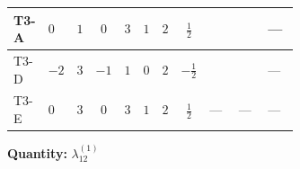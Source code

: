 \documentclass[8pt]{article}
\begin{document}
\begin{landscape}
\begin{longtable}{@{}llcccccc >{\raggedright\arraybackslash}p{0.21\linewidth} >{\raggedright\arraybackslash}p{0.21\linewidth} >{\raggedright\arraybackslash}p{0.21\linewidth}@{}}
\midrule
T3-A & $0$ & $1$ & $0$ & $3$ & $1$ & $2$ & $\frac{1}{2}$ & \scriptsize\adjustbox{max width=\linewidth}{$\begin{gathered} +4 {\lambda_{12}^{(1)}} {\lambda_{S_1}^{(1)}}\end{gathered}$} & \scriptsize\adjustbox{max width=\linewidth}{$\begin{gathered} +8 {\lambda_{12}^{(1)}} {\lambda_{S_2}^{(1)}}\end{gathered}$} & --- \\
\midrule
T3-D & $-2$ & $3$ & $-1$ & $1$ & $0$ & $2$ & $-\frac{1}{2}$ & \scriptsize\adjustbox{max width=\linewidth}{$\begin{gathered} +8 {\lambda_{12}^{(1)}} {\lambda_{S_1}^{(1)}}\end{gathered}$} & \scriptsize\adjustbox{max width=\linewidth}{$\begin{gathered} +4 {\lambda_{12}^{(1)}} {\lambda_{S_2}^{(1)}}\end{gathered}$} & --- \\
\midrule
T3-E & $0$ & $3$ & $0$ & $3$ & $1$ & $2$ & $\frac{1}{2}$ & --- & --- & --- \\
\midrule
\bottomrule
\end{longtable}
\clearpage
\noindent\textbf{Quantity: }$\lambda_{12}^{(1)}$\par\smallskip

\end{landscape}
\end{document}
